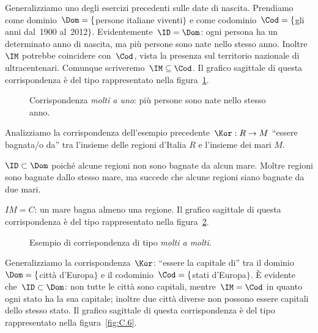 \begin{exrig}
\begin{esempio}
Generalizziamo uno degli esercizi precedenti sulle date di nascita. Prendiamo come dominio~$\Dom= \{$persone italiane viventi$\}$ e come codominio~$\Cod= \{$gli anni dal~1900 al~2012$\}$.
Evidentemente~$\ID=\Dom$: ogni persona ha un determinato anno di nascita, ma più persone sono nate nello stesso anno. Inoltre~$\IM$ potrebbe coincidere con~$\Cod$,
vista la presenza sul territorio nazionale di ultracentenari. Comunque scriveremo~$\IM \subseteq \Cod$. Il grafico sagittale di questa corrispondenza è del tipo rappresentato nella
figura~\ref{fig:C.4}.
\end{esempio}
\begin{figure}[hb]
 \centering
 \caption{Corrispondenza \emph{molti a uno}: più persone sono nate nello stesso anno.}\label{fig:C.4}
\end{figure}


\begin{esempio}
Analizziamo la corrispondenza dell'esempio precedente~$\Kor:R \rightarrow M$ ``essere bagnata/o da'' tra l'insieme delle regioni d'Italia $R$ e l'insieme dei mari $M$. 

$\ID\subset\Dom$ poiché alcune regioni non sono bagnate da alcun mare. Moltre regioni sono bagnate dallo stesso mare, ma succede che alcune regioni siano bagnate da
due mari. 

$IM=C$: un mare bagna almeno una regione. Il grafico sagittale di questa corrispondenza è del tipo rappresentato nella
figura~\ref{fig:C.5}.
\end{esempio}

\begin{figure}[hb]
 \centering
 \caption{Esempio di corrispondenza di tipo \emph{molti a molti}.}\label{fig:C.5}
\end{figure}

\begin{esempio}
Generalizziamo la corrispondenza~$\Kor$: ``essere la capitale di'' tra il dominio~$\Dom= \{$città d'Europa$\}$ e il codominio~$\Cod= \{$stati d'Europa$\}$. È evidente che~$\ID\subset\Dom$:
non tutte le città sono capitali, mentre~$\IM=\Cod$ in quanto ogni stato ha la sua capitale; inoltre due città diverse non possono essere capitali dello stesso stato.
Il grafico sagittale di questa corrispondenza è del tipo rappresentato nella
figura~\ref{fig:C.6}.
\end{esempio}


\end{exrig}
